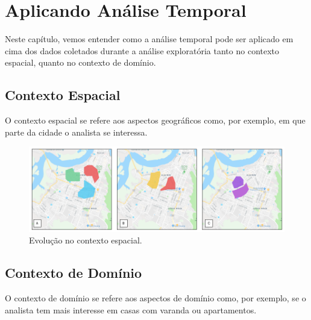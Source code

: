 \chapter{Aplicando Análise Temporal}
\label{chap:aplicando}

Neste capítulo, vemos entender como a análise temporal pode ser aplicado em cima dos dados coletados durante a análise exploratória tanto no contexto espacial, quanto no contexto de domínio.

\section{Contexto Espacial}

O contexto espacial se refere aos aspectos geográficos como, por exemplo, em que parte da cidade o analista se interessa.

\begin{figure}[t]
	\centering
	\includegraphics[width=\textwidth]{imagens/analise-contexto-espacial}
	\caption{Evolução no contexto espacial.}
	\label{fig:analise-contexto-espacial}
\end{figure}

\section{Contexto de Domínio}

O contexto de domínio se refere aos aspectos de domínio como, por exemplo, se o analista tem mais interesse em casas com varanda ou apartamentos.